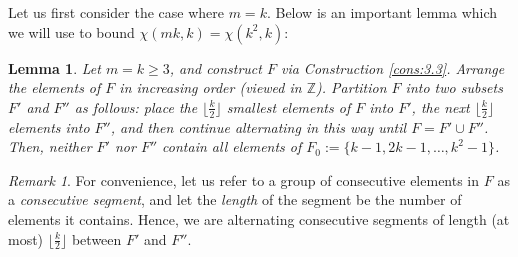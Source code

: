 \documentclass{article}
\newtheorem{lemma}[theorem]{Lemma}
\theoremstyle{definition}
\theoremstyle{remark}
\newtheorem*{remark}{Remark}
\begin{document}
Let us first consider the case where $m=k$. Below is an important lemma which we will use to bound $\chi(mk,k) = \chi(k^2,k)$:

\begin{lemma}\label{lem:partF}
    Let $m = k \geq 3$, and construct $F$ via Construction \ref{cons:3.3}. Arrange the elements of $F$ in increasing order (viewed in $\mathbb{Z}$). Partition $F$ into two subsets $F'$ and $F''$ as follows: place the $\lfloor\frac{k}{2}\rfloor$ smallest elements of $F$ into $F'$, the next $\lfloor\frac{k}{2}\rfloor$ elements into $F''$, and then continue alternating in this way until $F = F' \cup F''$. Then, neither $F'$ nor $F''$ contain all elements of $F_0 := \{k-1,2k-1,\ldots,k^2-1\}$.
\end{lemma}

\begin{remark}
    For convenience, let us refer to a group of consecutive elements in $F$ as a \textit{consecutive segment}, and let the \textit{length} of the segment be the number of elements it contains. Hence, we are alternating consecutive segments of length (at most) $\lfloor\frac{k}{2}\rfloor$ between $F'$ and $F''$.
\end{remark}
\end{document}
